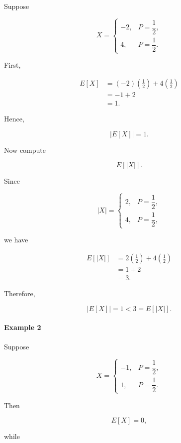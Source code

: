 \documentclass[11pt]{article}
\begin{document}
\begin{mdframed}[
		linewidth=0.8pt,
		roundcorner=6pt,
		backgroundcolor=gray!5,
		linecolor=gray!60,
		innertopmargin=10pt,
		innerbottommargin=10pt,
		innerleftmargin=10pt,
		innerrightmargin=10pt
		]
		Suppose
		
		\[
		X=
		\begin{cases}
			-2,&P=\dfrac12,\\[0.2cm]
			4,&P=\dfrac12.
		\end{cases}
		\]
		
		First,
		
		\[
		\begin{aligned}
			E[X]
			&=
			(-2)\left(\frac12\right)
			+
			4\left(\frac12\right)
			\\[0.3cm]
			&=
			-1+2
			\\[0.3cm]
			&=
			1.
		\end{aligned}
		\]
		
		Hence,
		
		\[
		|E[X]|=1.
		\]
		
		Now compute
		
		\[
		E[|X|].
		\]
		
		Since
		
		\[
		|X|=
		\begin{cases}
			2,&P=\dfrac12,\\[0.2cm]
			4,&P=\dfrac12,
		\end{cases}
		\]
		
		we have
		
		\[
		\begin{aligned}
			E[|X|]
			&=
			2\left(\frac12\right)
			+
			4\left(\frac12\right)
			\\[0.3cm]
			&=
			1+2
			\\[0.3cm]
			&=
			3.
		\end{aligned}
		\]
		
		Therefore,
		
		\[
		|E[X]|
		=
		1
		<
		3
		=
		E[|X|].
		\]
		
		\bigskip
		
		\paragraph{Example 2}
		
		Suppose
		
		\[
		X=
		\begin{cases}
			-1,&P=\dfrac12,\\[0.2cm]
			1,&P=\dfrac12.
		\end{cases}
		\]
		
		Then
		
		\[
		E[X]
		=
		0,
		\]
		
		while
		

\end{mdframed}
\end{document}
